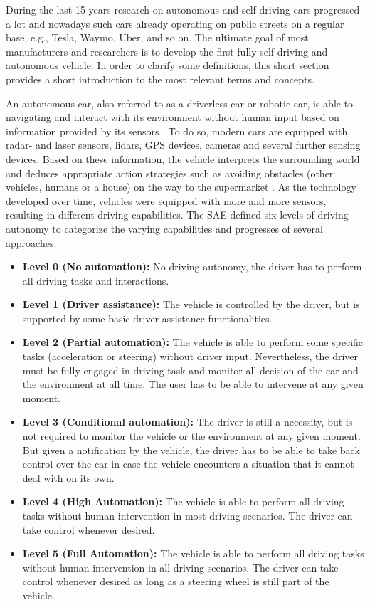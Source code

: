 \documentclass{llncs}
\begin{document}
{			During the last 15 years research on autonomous and self-driving cars progressed a lot and nowadays such cars already operating on public streets on a regular base, e.g., Tesla, Waymo, Uber, and so on. The ultimate goal of most manufacturers and researchers is to develop the first fully self-driving and autonomous vehicle. In order to clarify some definitions, this short section provides a short introduction to the most relevant terms and concepts.

			An autonomous car, also referred to as a driverless car or robotic car, is able to navigating and interact with its environment without human input based on information provided by its sensors \cite{gehrig1999dead}\cite{thrun2010toward}. To do so, modern cars are equipped with radar- and laser sensors, lidars, GPS devices, cameras and several further sensing devices. Based on these information, the vehicle interprets the surrounding world and deduces appropriate action strategies such as avoiding obstacles (other vehicles, humans or a house) on the way to the supermarket \cite{dokic2015european}\cite{zhu2014vehicle}. As the technology developed over time, vehicles were equipped with more and more sensors, resulting in different driving capabilities. The SAE \cite{autonomyLevelsSAE}
			defined six levels of driving autonomy to categorize the varying capabilities and progresses of several approaches:		
			
			\begin{itemize}
				\item \textbf{Level 0 (No automation): }No driving autonomy, the driver has to perform all driving tasks and interactions.
				\item \textbf{Level 1 (Driver assistance): }The vehicle is controlled by the driver, but is supported by some basic driver assistance functionalities.
				\item \textbf{Level 2 (Partial automation): }The vehicle is able to perform some specific tasks (acceleration or steering) without driver input. Nevertheless, the driver must be fully engaged in driving task and monitor all decision of the car and the environment at all time. The user has to be able to intervene at any given moment. 
				\item \textbf{Level 3 (Conditional automation): }The driver is still a necessity, but is not required to monitor the vehicle or the environment at any given moment. But given a notification by the vehicle, the driver has to be able to take back control over the car in case the vehicle encounters a situation that it cannot deal with on its own.
				\item \textbf{Level 4 (High Automation): }The vehicle is able to perform all driving tasks without human intervention in most driving scenarios. The driver can take control whenever desired.
				\item \textbf{Level 5 (Full Automation): }The vehicle is able to perform all driving tasks without human intervention in all driving scenarios. The driver can take control whenever desired as long as a steering wheel is still part of the vehicle.
			\end{itemize}
			
}
\end{document}

